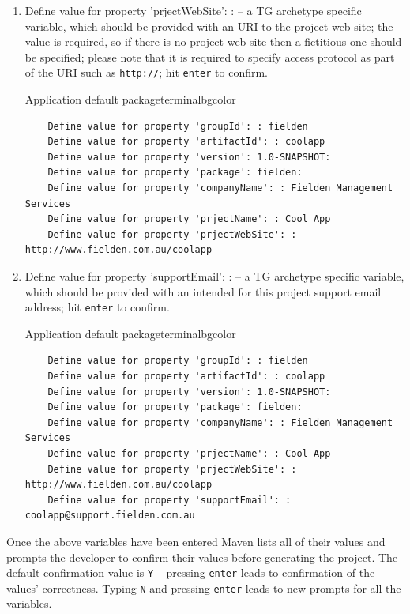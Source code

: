 \begin{enumerate}
    \item Define value for property 'prjectWebSite': : -- a TG archetype specific variable, which should be provided with an URI to the project web site; the value is required, so if there is no project web site then a fictitious one should be specified; please note that it is required to specify access protocol as part of the URI such as \texttt{http://}; hit \texttt{enter} to confirm.
    
    \begin{code}{Application default package}{\label{lst::archetype-package}}{terminalbgcolor}
      \begin{lstlisting}
	Define value for property 'groupId': : fielden		
	Define value for property 'artifactId': : coolapp
	Define value for property 'version': 1.0-SNAPSHOT:
	Define value for property 'package': fielden:	
	Define value for property 'companyName': : Fielden Management Services
	Define value for property 'prjectName': : Cool App
	Define value for property 'prjectWebSite': : http://www.fielden.com.au/coolapp
      \end{lstlisting}
    \end{code}

    \item Define value for property 'supportEmail': : -- a TG archetype specific variable, which should be provided with an intended for this project support email address; hit \texttt{enter} to confirm.
    
    \begin{code}{Application default package}{\label{lst::archetype-package}}{terminalbgcolor}
      \begin{lstlisting}
	Define value for property 'groupId': : fielden		
	Define value for property 'artifactId': : coolapp
	Define value for property 'version': 1.0-SNAPSHOT:
	Define value for property 'package': fielden:	
	Define value for property 'companyName': : Fielden Management Services
	Define value for property 'prjectName': : Cool App
	Define value for property 'prjectWebSite': : http://www.fielden.com.au/coolapp
	Define value for property 'supportEmail': : coolapp@support.fielden.com.au
      \end{lstlisting}
    \end{code}

  \end{enumerate}

  Once the above variables have been entered Maven lists all of their values and prompts the developer to confirm their values before generating the project. 
  The default confirmation value is \texttt{Y} -- pressing \texttt{enter} leads to confirmation of the values' correctness. 
  Typing \texttt{N} and pressing \texttt{enter} leads to new prompts for all the variables.

